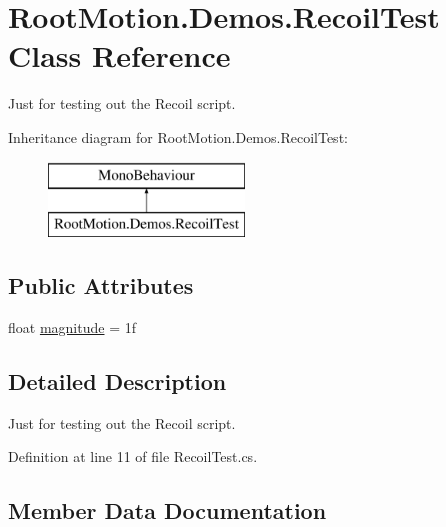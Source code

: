 \hypertarget{class_root_motion_1_1_demos_1_1_recoil_test}{}\section{Root\+Motion.\+Demos.\+Recoil\+Test Class Reference}
\label{class_root_motion_1_1_demos_1_1_recoil_test}


Just for testing out the Recoil script.  


Inheritance diagram for Root\+Motion.\+Demos.\+Recoil\+Test\+:\begin{figure}[H]
\begin{center}
\leavevmode
\includegraphics[height=2.000000cm]{class_root_motion_1_1_demos_1_1_recoil_test}
\end{center}
\end{figure}
\subsection*{Public Attributes}
\begin{DoxyCompactItemize}
\item 
float \mbox{\hyperlink{class_root_motion_1_1_demos_1_1_recoil_test_a8af5837f56296abde40abf9080251297}{magnitude}} = 1f
\end{DoxyCompactItemize}


\subsection{Detailed Description}
Just for testing out the Recoil script. 



Definition at line 11 of file Recoil\+Test.\+cs.



\subsection{Member Data Documentation}
\mbox{\label{class_root_motion_1_1_demos_1_1_recoil_test_a8af5837f56296abde40abf9080251297}} 
